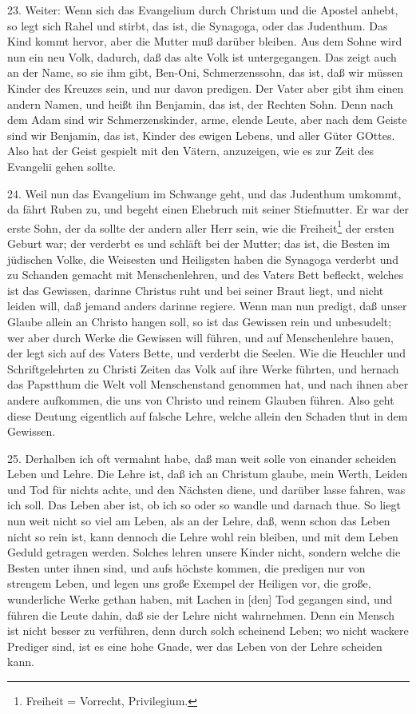 23. Weiter: Wenn sich das Evangelium durch Christum und die Apostel anhebt, so legt sich Rahel und stirbt, das ist, die Synagoga, oder das Judenthum. Das Kind kommt hervor, aber die Mutter muß darüber bleiben. Aus dem Sohne wird nun ein neu Volk, dadurch, daß das alte Volk ist untergegangen. Das zeigt auch an der Name, so sie ihm gibt, Ben-Oni, Schmerzenssohn, das ist, daß wir müssen Kinder des Kreuzes sein, und nur davon predigen. Der Vater aber gibt ihm einen andern Namen, und heißt ihn Benjamin, das ist, der Rechten Sohn. Denn nach dem Adam sind wir Schmerzenskinder, arme, elende Leute, aber nach dem Geiste sind wir Benjamin, das ist, Kinder des ewigen Lebens, und aller Güter GOttes. Also hat der Geist gespielt mit den Vätern, anzuzeigen, wie es zur Zeit des Evangelii gehen sollte.

24. Weil nun das Evangelium im Schwange geht, und das Judenthum umkommt, da fährt Ruben zu, und begeht einen Ehebruch mit seiner Stiefmutter. Er war der erste Sohn, der da sollte der andern aller Herr sein, wie die Freiheit\footnote{Freiheit = Vorrecht, Privilegium.} der ersten Geburt war; der verderbt es und schläft bei der Mutter; das ist, die Besten im jüdischen Volke, die Weisesten und Heiligsten haben die Synagoga verderbt und zu Schanden gemacht mit Menschenlehren, und des Vaters Bett befleckt, welches ist das Gewissen, darinne Christus ruht und bei seiner Braut liegt, und nicht leiden will, daß jemand anders darinne regiere. Wenn man nun predigt, daß unser Glaube allein an Christo hangen soll, so ist das Gewissen rein und unbesudelt; wer aber durch Werke die Gewissen will führen, und auf Menschenlehre bauen, der legt sich auf des Vaters Bette, und verderbt die Seelen. Wie die Heuchler und Schriftgelehrten zu Christi Zeiten das Volk auf ihre Werke führten, und hernach das Papstthum die Welt voll Menschenstand genommen hat, und nach ihnen aber andere aufkommen, die uns von Christo und reinem Glauben führen. Also geht diese Deutung eigentlich auf falsche Lehre, welche allein den Schaden thut in dem Gewissen.

25. Derhalben ich oft vermahnt habe, daß man weit solle von einander scheiden Leben und
Lehre. Die Lehre ist, daß ich an Christum glaube, mein Werth, Leiden und Tod für nichts achte, und den Nächsten diene, und darüber lasse fahren, was ich soll. Das Leben aber ist, ob ich so oder so wandle und darnach thue. So liegt nun weit nicht so viel am Leben, als an der Lehre, daß, wenn schon das Leben nicht so rein ist, kann dennoch die Lehre wohl rein bleiben, und mit dem Leben Geduld getragen werden. Solches lehren unsere Kinder nicht, sondern welche die Besten unter ihnen sind, und aufs höchste kommen, die predigen nur von strengem Leben, und legen uns große Exempel der Heiligen vor, die große, wunderliche Werke gethan haben, mit Lachen in [den] Tod gegangen sind, und führen die Leute dahin, daß sie der Lehre nicht wahrnehmen. Denn ein Mensch ist nicht besser zu verführen, denn durch solch scheinend Leben; wo nicht wackere Prediger sind, ist es eine hohe Gnade, wer das Leben von der Lehre scheiden kann.

